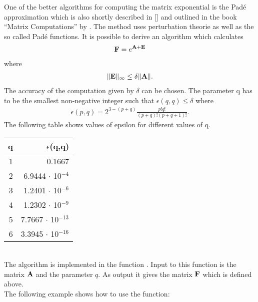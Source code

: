 \label{sec:pade_approximation}

One of the better algorithms for computing the matrix exponential is
the Pad\'e approximation which is also shortly described in
[\cite{Moler_Loan:79}] and outlined in the book ``Matrix
Computations'' by \cite{Golub_Loan:91}. 
The method uses perturbation theorie as well as the so called Pad\'e
functions. It is possible to derive an algorithm which calculates
\begin{eqnarray}
  {\bf F} = e^{{\bf A}+{\bf E}} 
\end{eqnarray}
where 
\begin{eqnarray}
  \|{\bf E}\|_\infty \le \delta \|{\bf A}\| .
\end{eqnarray}
The accuracy of the computation given by $\delta$ can be chosen. 
The parameter q has to be the smallest non-negative integer such that
$\epsilon(q,q)\le\delta$ where
\begin{eqnarray}
  \epsilon(p,q) = 2^{3-(p+q)}\frac{p!q!}{(p+q)!(p+q+1)!}.
\end{eqnarray}
The following table shows values of epsilon for
different values of q.
\vspace{0.5cm}\\
\begin{tabular}[h]{|r|r|}
 \hline
q & $\epsilon$(q,q) \\ \hline
1 & 0.1667\\
2 & 6.9444 $\cdot$ 10$^{-4}$ \\
3 & 1.2401 $\cdot$ 10$^{-6}$ \\
4 & 1.2302 $\cdot$ 10$^{-9}$ \\
5 & 7.7667 $\cdot$ 10$^{-13}$ \\
6 & 3.3945 $\cdot$ 10$^{-16}$ \\ 
\hline
\end{tabular}
\vspace{0.5cm}\\
The algorithm is implemented in the function . Input
to this function is the matrix ${\bf A}$ and the parameter $q$. As output
it gives the matrix ${\bf F}$ which is defined above.\\
The following example shows how to use the  function:
